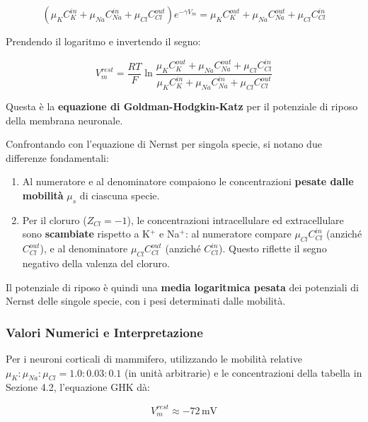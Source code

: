 \begin{equation}
\left(\mu_K C_K^{in} + \mu_{Na} C_{Na}^{in} + \mu_{Cl} C_{Cl}^{out}\right) e^{-\gamma V_m} = \mu_K C_K^{out} + \mu_{Na} C_{Na}^{out} + \mu_{Cl} C_{Cl}^{in}
\end{equation}

Prendendo il logaritmo e invertendo il segno:

\begin{equation}
\boxed{V_m^{rest} = \frac{RT}{F} \ln \frac{\mu_K C_K^{out} + \mu_{Na} C_{Na}^{out} + \mu_{Cl} C_{Cl}^{in}}{\mu_K C_K^{in} + \mu_{Na} C_{Na}^{in} + \mu_{Cl} C_{Cl}^{out}}}
\end{equation}

Questa è la \textbf{equazione di Goldman-Hodgkin-Katz} per il potenziale di riposo della membrana neuronale.

Confrontando con l'equazione di Nernst per singola specie, si notano due differenze fondamentali:

\begin{enumerate}
    \item Al numeratore e al denominatore compaiono le concentrazioni \textbf{pesate dalle mobilità} $\mu_s$ di ciascuna specie.
    \item Per il cloruro ($Z_{Cl} = -1$), le concentrazioni intracellulare ed extracellulare sono \textbf{scambiate} rispetto a K$^+$ e Na$^+$: al numeratore compare $\mu_{Cl} C_{Cl}^{in}$ (anziché $C_{Cl}^{out}$), e al denominatore $\mu_{Cl} C_{Cl}^{out}$ (anziché $C_{Cl}^{in}$). Questo riflette il segno negativo della valenza del cloruro.
\end{enumerate}

Il potenziale di riposo è quindi una \textbf{media logaritmica pesata} dei potenziali di Nernst delle singole specie, con i pesi determinati dalle mobilità.

\subsubsection{Valori Numerici e Interpretazione}

Per i neuroni corticali di mammifero, utilizzando le mobilità relative $\mu_K : \mu_{Na} : \mu_{Cl} = 1.0 : 0.03 : 0.1$ (in unità arbitrarie) e le concentrazioni della tabella in Sezione 4.2, l'equazione GHK dà:

\begin{equation}
V_m^{rest} \approx -72\,\text{mV}
\end{equation}

